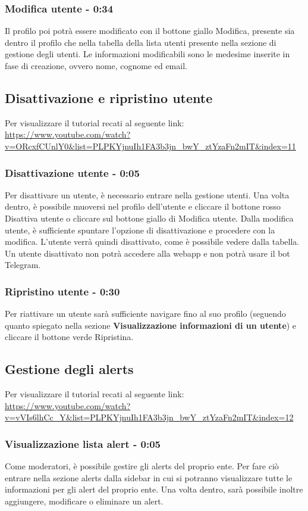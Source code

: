 	\subsubsection{Modifica utente - 0:34}
		Il profilo poi potrà essere modificato con il bottone giallo Modifica, presente sia dentro il profilo che nella tabella della lista utenti presente nella sezione di gestione degli utenti.
		Le informazioni modificabili sono le medesime inserite in fase di creazione, ovvero nome, cognome ed email.



\subsection{Disattivazione e ripristino utente}
Per visualizzare il tutorial recati al seguente link: 
\url{https://www.youtube.com/watch?v=ORcxfCUnlY0&list=PLPKYjnuIh1FA3b3jn_bwY_ztYzaFn2mIT&index=11}

	\subsubsection{Disattivazione utente - 0:05}
		Per disattivare un utente, è necessario entrare nella gestione utenti.
		Una volta dentro, è possibile muoversi nel profilo dell'utente e cliccare il bottone rosso Disattiva utente o cliccare sul bottone giallo di Modifica utente.
		Dalla modifica utente, è sufficiente spuntare l'opzione di disattivazione e procedere con la modifica.
		L'utente verrà quindi disattivato, come è possibile vedere dalla tabella. Un utente disattivato non potrà accedere alla webapp e non potrà usare il bot Telegram.

	\subsubsection{Ripristino utente - 0:30}
		Per riattivare un utente sarà sufficiente navigare fino al suo profilo (seguendo quanto spiegato nella sezione \textbf{Visualizzazione informazioni di un utente}) e cliccare il bottone verde Ripristina.


\subsection{Gestione degli alerts}
Per visualizzare il tutorial recati al seguente link: 
\url{https://www.youtube.com/watch?v=vVIs6lhCc_Y&list=PLPKYjnuIh1FA3b3jn_bwY_ztYzaFn2mIT&index=12}

	\subsubsection{Visualizzazione lista alert - 0:05}
		Come moderatori, è possibile gestire gli alerts del proprio ente.
		Per fare ciò entrare nella sezione alerts dalla sidebar in cui si potranno visualizzare tutte le informazioni per gli alert del proprio ente. 
		Una volta dentro, sarà possibile inoltre aggiungere, modificare o eliminare un alert.

